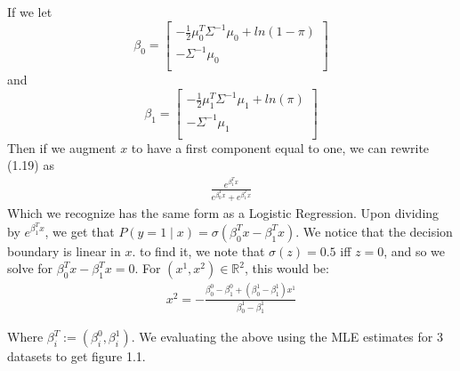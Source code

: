 \documentclass[paper=a4, fontsize=11pt]{scrartcl} %
\numberwithin{equation}{section} %
\numberwithin{figure}{section} %
\numberwithin{table}{section} %
\begin{document}
	If we let
	\begin{equation}
	\beta_0=\begin{bmatrix}
	 -\frac{1}{2}\mu_0^T\Sigma^{-1}\mu_0 + ln(1-\pi)\\
	-\Sigma^{-1}\mu_0 \\
	\end{bmatrix}
	\end{equation}
	and
	\begin{equation}
	\beta_1=\begin{bmatrix}
	-\frac{1}{2}\mu_1^T\Sigma^{-1}\mu_1 + ln(\pi)\\
	-\Sigma^{-1}\mu_1 \\
	\end{bmatrix}
	\end{equation}
	Then if we augment \(x\) to have a first component equal to one, we can rewrite (1.19) as
	\begin{align}
	\frac{e^{\beta_1^Tx}}{e^{\beta_0^Tx}+e^{\beta_1^Tx}}
	\end{align}
	Which we recognize has the same form as a Logistic Regression.
	Upon dividing by \(e^{\beta_1^Tx}\), we get that \(P(y=1 \mid x) = \sigma\left(\beta_0^Tx-\beta_1^Tx\right)\).
	We notice that the decision boundary is linear in \(x\). to find it, we note that \(\sigma(z) = 0.5\) iff \(z = 0\), and so we solve for \(\beta_0^Tx-\beta_1^Tx = 0\). For \((x^1,x^2) \in \mathbb{R}^2\), this would be:
	\begin{align}
	x^2 = -\frac{\beta_0^0-\beta_1^{0} + (\beta_0^{1}-\beta_1^{1})x^1}{\beta_0^{1}-\beta_1^{1}}
	\end{align}
	
	Where \(\beta_i^T := (\beta_i^0, \beta_i^1)\). We evaluating the above using the MLE estimates for 3 datasets to get figure 1.1.
	
\end{document}
